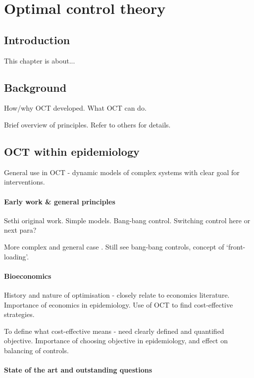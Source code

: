 \chapter{Optimal control theory}\label{ch:oct}

\section{Introduction}\label{sec:ch2:intro}

This chapter is about...

\section{Background}\label{sec:ch2:background}

How/why OCT developed. What OCT can do.

Brief overview of principles. Refer to others for details.

\section{OCT within epidemiology}\label{sec:ch2:oct_in_epidem}

General use in OCT - dynamic models of complex systems with clear goal for interventions.

\subsubsection{Early work \& general principles}

Sethi original work. Simple models. Bang-bang control. Switching control here or next para?

More complex and general case \citep{behncke_optimal_2000}. Still see bang-bang controls, concept of `front-loading'.

\subsubsection{Bioeconomics}

History and nature of optimisation - closely relate to economics literature. Importance of economics in epidemiology. Use of OCT to find cost-effective strategies.

To define what cost-effective means - need clearly defined and quantified objective. Importance of choosing objective in epidemiology, and effect on balancing of controls.

\subsubsection{State of the art and outstanding questions}

